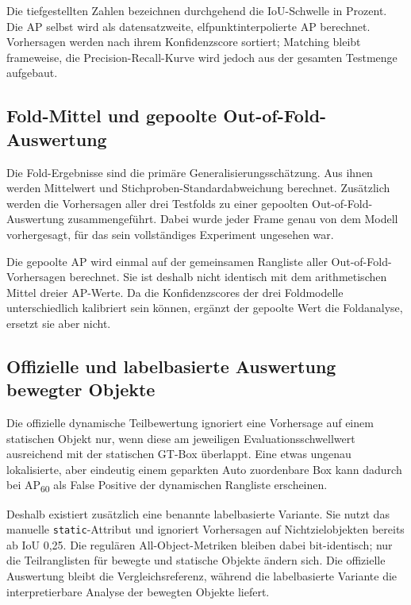 Die tiefgestellten Zahlen bezeichnen durchgehend die IoU-Schwelle in Prozent. Die AP selbst wird als datensatzweite, elfpunktinterpolierte AP berechnet. Vorhersagen werden nach ihrem Konfidenzscore sortiert; Matching bleibt frameweise, die Precision-Recall-Kurve wird jedoch aus der gesamten Testmenge aufgebaut.

\subsection{Fold-Mittel und gepoolte Out-of-Fold-Auswertung}

Die Fold-Ergebnisse sind die primäre Generalisierungsschätzung. Aus ihnen werden Mittelwert und Stichproben-Standardabweichung berechnet. Zusätzlich werden die Vorhersagen aller drei Testfolds zu einer gepoolten Out-of-Fold-Auswertung zusammengeführt. Dabei wurde jeder Frame genau von dem Modell vorhergesagt, für das sein vollständiges Experiment ungesehen war.

Die gepoolte AP wird einmal auf der gemeinsamen Rangliste aller Out-of-Fold-Vorhersagen berechnet. Sie ist deshalb nicht identisch mit dem arithmetischen Mittel dreier AP-Werte. Da die Konfidenzscores der drei Foldmodelle unterschiedlich kalibriert sein können, ergänzt der gepoolte Wert die Foldanalyse, ersetzt sie aber nicht.

\subsection{Offizielle und labelbasierte Auswertung bewegter Objekte}

Die offizielle dynamische Teilbewertung ignoriert eine Vorhersage auf einem statischen Objekt nur, wenn diese am jeweiligen Evaluationsschwellwert ausreichend mit der statischen GT-Box überlappt. Eine etwas ungenau lokalisierte, aber eindeutig einem geparkten Auto zuordenbare Box kann dadurch bei AP\textsubscript{60} als False Positive der dynamischen Rangliste erscheinen.

Deshalb existiert zusätzlich eine benannte labelbasierte Variante. Sie nutzt das manuelle \texttt{static}-Attribut und ignoriert Vorhersagen auf Nichtzielobjekten bereits ab IoU 0{,}25. Die regulären All-Object-Metriken bleiben dabei bit-identisch; nur die Teilranglisten für bewegte und statische Objekte ändern sich. Die offizielle Auswertung bleibt die Vergleichsreferenz, während die labelbasierte Variante die interpretierbare Analyse der bewegten Objekte liefert.

